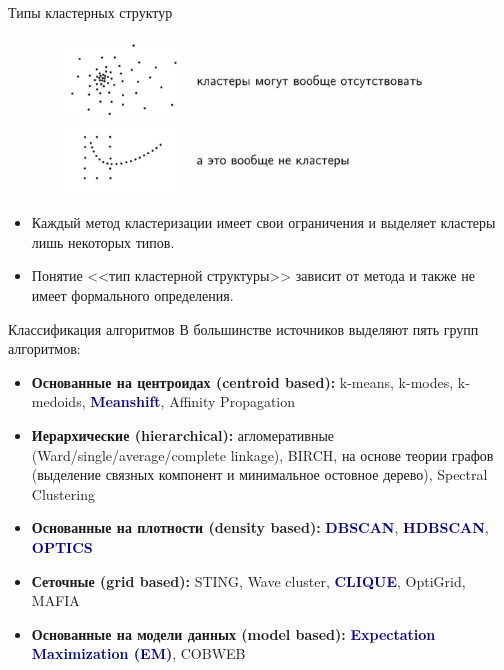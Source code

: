 \documentclass[unicode, notheorems, handout]{beamer}
\begin{document}
\begin{frame}{Типы кластерных структур}

\begin{figure}[h]
      \centering
    \includegraphics[width=0.9\textwidth]{clust3.jpg} 
    \end{figure}
    
\begin{itemize}
    \item Каждый метод кластеризации имеет свои ограничения и выделяет кластеры лишь некоторых типов. 
    \item Понятие <<тип кластерной структуры>> зависит от метода и также не имеет формального определения. 
\end{itemize}
    
\end{frame}

\begin{frame}{Классификация алгоритмов}
В большинстве источников выделяют пять групп алгоритмов:
\begin{itemize}
    \item \textbf{Основанные на центроидах (centroid based):}
k-means, k-modes, k-medoids, \textbf{\textcolor{darkblue}{Meanshift}}, Affinity Propagation

\item \textbf{Иерархические (hierarchical):} агломеративные (Ward/single/average/complete linkage), BIRCH, на основе теории графов (выделение связных компонент и минимальное остовное дерево), Spectral Clustering

\item \textbf{Основанные на плотности (density based):} \textbf{\textcolor{darkblue}{DBSCAN}}, \textbf{\textcolor{darkblue}{HDBSCAN}}, \textbf{\textcolor{darkblue}{OPTICS}}

\item \textbf{Сеточные (grid based):} STING, Wave cluster, \textbf{\textcolor{darkblue}{CLIQUE}}, OptiGrid, MAFIA

\item \textbf{Основанные на модели данных (model based):} \textbf{\textcolor{darkblue}{Expectation Maximization (EM)}}, COBWEB 
\end{itemize}
\end{frame}
\end{document}
